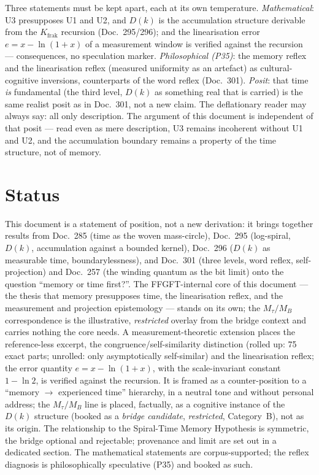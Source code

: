 Three statements must be kept apart, each at its own temperature. \emph{Mathematical}: U3
presupposes U1 and U2, and $D(k)$ is the accumulation structure derivable from the
$K_{\text{frak}}$ recursion (Doc.~295/296); and the linearisation error $e=x-\ln(1+x)$ of a
measurement window is verified against the recursion --- consequences, no speculation marker.
\emph{Philosophical (P35)}: the memory reflex and the linearisation reflex
(measured uniformity as an artefact) as cultural-cognitive inversions, counterparts of the
word reflex (Doc.~301). \emph{Posit}: that time \emph{is} fundamental
(the third level, $D(k)$ as something real that is carried) is the same realist posit as in
Doc.~301, not a new claim. The deflationary reader may always say: all only description. The
argument of this document is independent of that posit --- read even as mere description, U3
remains incoherent without U1 and U2, and the accumulation boundary remains a property of
the time structure, not of memory.

\section{Status}

This document is a statement of position, not a new derivation: it brings together results
from Doc.~285 (time as the woven mass-circle), Doc.~295 (log-spiral, $D(k)$, accumulation
against a bounded kernel), Doc.~296 ($D(k)$ as measurable time, boundarylessness), and
Doc.~301 (three levels, word reflex, self-projection) and Doc.~257 (the winding quantum as
the bit limit) onto the question \enquote{memory or
time first?}. The FFGFT-internal core of this document --- the thesis that memory presupposes
time, the linearisation reflex, and the measurement and projection epistemology --- stands on
its own; the $M_\tau/M_B$ correspondence is the illustrative, \emph{restricted} overlay from
the bridge context and carries nothing the core needs. A measurement-theoretic extension places the reference-less excerpt, the congruence/self-similarity
distinction (rolled up: 75 exact parts; unrolled: only asymptotically self-similar) and the
linearisation reflex; the error quantity $e=x-\ln(1+x)$, with the scale-invariant constant
$1-\ln 2$, is verified against the recursion. It is framed as a counter-position to a \enquote{memory $\to$ experienced
time} hierarchy, in a neutral tone and without personal address; the $M_\tau/M_B$ line is
placed, factually, as a cognitive instance of the $D(k)$ structure (booked as a
\emph{bridge candidate}, \emph{restricted}, Category~B), not as its origin. The relationship to the Spiral-Time
Memory Hypothesis is symmetric, the bridge optional and rejectable; provenance and limit are
set out in a dedicated section. The
mathematical statements are corpus-supported; the reflex diagnosis is philosophically
speculative (P35) and booked as such.
